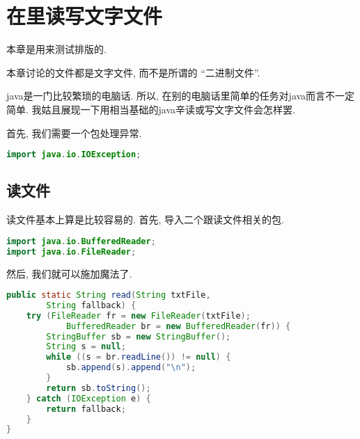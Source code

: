 \chapter{在里读写文字文件}

\begin{remark*}
    本章是用来测试排版的.
\end{remark*}

\begin{remark*}
    本章讨论的文件都是文字文件,
    而不是所谓的 ``二进制文件''.
\end{remark*}

\gls{java}是一门比较繁琐的电脑话.
所以, 在别的电脑话里简单的任务对\gls{java}而言不一定简单.
我姑且展现一下用相当基础的\gls{java}辛读或写文字文件会怎样罢.

首先, 我们需要一个包处理异常.
\begin{lstlisting}[language=Java]
import java.io.IOException;
\end{lstlisting}

\section{读文件}

读文件基本上算是比较容易的.
首先, 导入二个跟读文件相关的包.
\begin{lstlisting}[language=Java]
import java.io.BufferedReader;
import java.io.FileReader;
\end{lstlisting}

然后, 我们就可以施加魔法了.
\begin{lstlisting}[frame=single,language=Java]
public static String read(String txtFile,
        String fallback) {
    try (FileReader fr = new FileReader(txtFile);
            BufferedReader br = new BufferedReader(fr)) {
        StringBuffer sb = new StringBuffer();
        String s = null;
        while ((s = br.readLine()) != null) {
            sb.append(s).append("\n");
        }
        return sb.toString();
    } catch (IOException e) {
        return fallback;
    }
}
\end{lstlisting}

